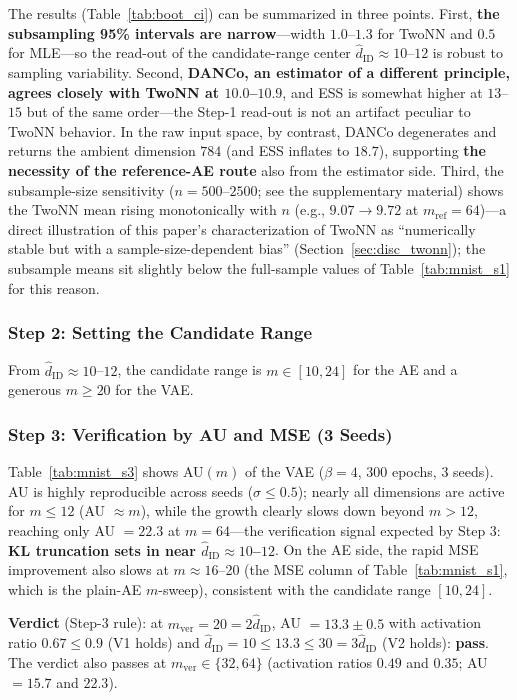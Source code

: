 \documentclass[make,article,submit,pdftex,moreauthors]{Definitions/mdpi}
\newcommand{\hatdID}{\hat{d}_{\mathrm{ID}}}
\begin{document}
The results (Table~\ref{tab:boot_ci}) can be summarized in three points.
First, \textbf{the subsampling 95\% intervals are narrow}---width
$1.0$--$1.3$ for TwoNN and $0.5$ for MLE---so the read-out of the
candidate-range center $\hatdID \approx 10$--$12$ is robust to sampling
variability.
Second, \textbf{DANCo, an estimator of a different principle, agrees
closely with TwoNN at $10.0$--$10.9$}, and ESS is somewhat higher at
$13$--$15$ but of the same order---the Step-1 read-out is not an artifact
peculiar to TwoNN behavior.
In the raw input space, by contrast, DANCo degenerates and returns the
ambient dimension $784$ (and ESS inflates to $18.7$), supporting
\textbf{the necessity of the reference-AE route} also from the estimator
side.
Third, the subsample-size sensitivity ($n = 500$--$2500$; see the
supplementary material) shows the TwoNN mean rising monotonically with $n$
(e.g., $9.07 \to 9.72$ at $m_{\mathrm{ref}} = 64$)---a direct illustration
of this paper's characterization of TwoNN as ``numerically stable but with
a sample-size-dependent bias'' (Section~\ref{sec:disc_twonn}); the
subsample means sit slightly below the full-sample values of
Table~\ref{tab:mnist_s1} for this reason.

\subsubsection{Step 2: Setting the Candidate Range}

From $\hatdID \approx 10$--$12$, the candidate range is $m \in [10, 24]$
for the AE and a generous $m \geq 20$ for the VAE.

\subsubsection{Step 3: Verification by AU and MSE (3 Seeds)}

Table~\ref{tab:mnist_s3} shows AU$(m)$ of the VAE ($\beta = 4$, 300 epochs,
3 seeds).
AU is highly reproducible across seeds ($\sigma \leq 0.5$); nearly all
dimensions are active for $m \leq 12$ (AU $\approx m$), while the growth
clearly slows down beyond $m > 12$, reaching only AU $= 22.3$ at
$m = 64$---the verification signal expected by Step 3:
\textbf{KL truncation sets in near $\hatdID \approx 10$--$12$}.
On the AE side, the rapid MSE improvement also slows at
$m \approx 16$--20 (the MSE column of Table~\ref{tab:mnist_s1}, which is the
plain-AE $m$-sweep), consistent with the candidate range $[10, 24]$.

\textbf{Verdict} (Step-3 rule): at $m_{\mathrm{ver}} = 20 = 2\hatdID$,
AU $= 13.3 \pm 0.5$ with activation ratio $0.67 \leq 0.9$ (V1 holds) and
$\hatdID = 10 \leq 13.3 \leq 30 = 3\hatdID$ (V2 holds): \textbf{pass}.
The verdict also passes at $m_{\mathrm{ver}} \in \{32, 64\}$
(activation ratios $0.49$ and $0.35$; AU $= 15.7$ and $22.3$).
\end{document}
